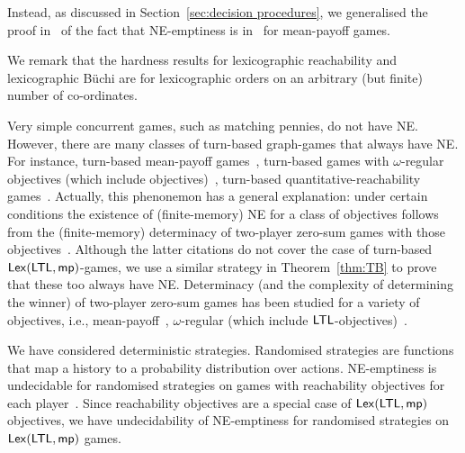 Instead, as discussed in Section~\ref{sec:decision procedures}, we generalised the proof in~\cite{DBLP:journals/corr/abs-1109-6220} of the fact that NE-emptiness is in \np\ for mean-payoff games. 

We remark that the hardness results for lexicographic reachability and lexicographic B\"uchi are for lexicographic orders on an arbitrary (but finite) number of co-ordinates.

Very simple concurrent games, such as matching pennies, do not have NE. However, there are many classes of turn-based graph-games that always have NE. For instance, turn-based mean-payoff games~\cite{Alpe91}, turn-based games with $\omega$-regular objectives (which include \LTL objectives)~\cite{CJM04}, turn-based quantitative-reachability games~\cite{Brihaye2013}. Actually, this phenonemon has a general explanation: under certain conditions the existence of (finite-memory) NE for a class of objectives follows from the (finite-memory) determinacy of two-player zero-sum games with those objectives~\cite{DBLP:journals/corr/0001P16,Brihaye2013}. Although the latter citations do not cover the case of turn-based ${\sf Lex}(\mathsf{LTL},{\sf mp})$-games, we use a similar strategy in Theorem~\ref{thm:TB} to prove that these too always have NE. Determinacy (and the complexity of determining the winner) of two-player zero-sum games has been studied for a variety of objectives, 
i.e., mean-payoff~\cite{EM79,ZwPa95}, $\omega$-regular (which include $\mathsf{LTL}$-objectives)~\cite{DBLP:conf/dagstuhl/2001automata}.

We have considered deterministic strategies. Randomised strategies are functions that map a history to a probability distribution over actions. 
NE-emptiness is undecidable for randomised strategies on games with reachability objectives for each player~\cite{DBLP:conf/fsttcs/BouyerMS14}. Since reachability objectives are a special case of ${\sf Lex}(\mathsf{LTL},{\sf mp})$ objectives, we have undecidability of NE-emptiness for randomised strategies on ${\sf Lex}(\mathsf{LTL},{\sf mp})$ games.


% 



